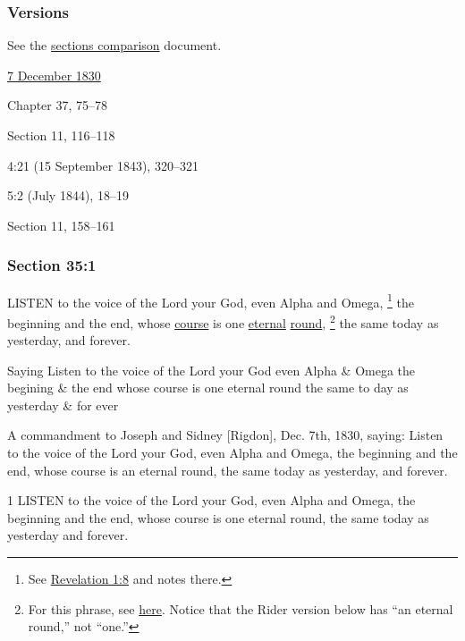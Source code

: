 	\subsubsection{Versions}
		\label{DC35-V}
		
		See the \href{https://drive.google.com/file/d/1goAvNz8jS4R8slYfMG_db55Ty2z_vmgK/view?usp=sharing}{sections comparison} document.
	
		\begin{compactdesc}
			\item[JSP] \hyperref[EMS-1830-JS-7-DEC-1830]{7 December 1830}
			\item[BC] Chapter 37, 75--78
			\item[DC 1835] Section 11, 116--118
			\item[TS] 4:21 (15 September 1843), 320--321
			\item[MS] 5:2 (July 1844), 18--19
			\item[DC 1844] Section 11, 158--161
		\end{compactdesc}

	\subsubsection{Section 35:1} %
		\label{DC35-1}

		LISTEN to the voice of the Lord your God, even Alpha and Omega,%
			\footnote{%
				See \hyperref[REVELATIONNT-1-8]{Revelation 1:8} and notes there.
				}
		the beginning and the end, whose \hyperref[ROUND-PHRASES]{course} is one \hyperref[ETERNITY]{eternal} \hyperref[ROUND]{round},%
			\footnote{%
				For this phrase, see \hyperref[ROUND-PHRASES]{here}. Notice that the Rider version below has ``an eternal round,'' not ``one.''
				}
		the same today as yesterday, and forever.

		\begin{framed}
		\scriptsize
			\begin{compactdesc}
				\item[JSP] Saying Listen to the voice of the Lord your God even Alpha \& Omega the begining \& the end whose course is one eternal round the same to day as yesterday \& for ever
				\item[Rider] A commandment to Joseph and Sidney [Rigdon], Dec. 7th, 1830, saying: Listen to the voice of the Lord your God, even Alpha and Omega, the beginning and the end, whose course is an eternal round, the same today as yesterday, and forever.
				\item[BC] 1 LISTEN to the voice of the Lord your God, even Alpha and Omega, the beginning and the end, whose course is one eternal round, the same today as yesterday and forever.
			\end{compactdesc}
		\end{framed}

